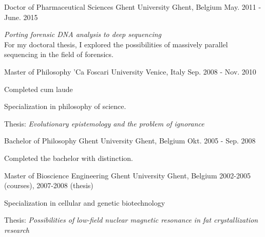 

\begin{cventries}

  \cventry
    {Doctor of Pharmaceutical Sciences} %
    {Ghent University} %
    {Ghent, Belgium} %
    {May. 2011 - June. 2015} %
    {
      \begin{cvitems} %
      \item {\emph{Porting forensic DNA analysis to deep sequencing}
          \\ For my doctoral thesis, I explored the possibilities of
          massively parallel sequencing in the field of forensics.
        }
      \end{cvitems}
    }

  \cventry
    {Master of Philosophy} %
    {'Ca Foscari University} %
    {Venice, Italy} %
    {Sep. 2008 - Nov. 2010} %
    {
      \begin{cvitems} %
      \item {Completed cum laude}
      \item {Specialization in philosophy of science.}
      \item {Thesis: \emph{Evolutionary epistemology and the problem
            of ignorance}}
      \end{cvitems}
    }

  \cventry
    {Bachelor of Philosophy} %
    {Ghent University} %
    {Ghent, Belgium} %
    {Okt. 2005 - Sep. 2008} %
    {
      \begin{cvitems} %
        \item {Completed the bachelor with distinction.}
      \end{cvitems}
    }

  \cventry
    {Master of Bioscience Engineering} %
    {Ghent University} %
    {Ghent, Belgium} %
    {2002-2005 (courses), 2007-2008 (thesis)} %
    {
      \begin{cvitems} %
        \item {Specialization in cellular and genetic biotechnology}
        \item {Thesis: \emph{Possibilities of low-field nuclear
              magnetic resonance in fat crystallization research}}
      \end{cvitems}
    }


\end{cventries}
